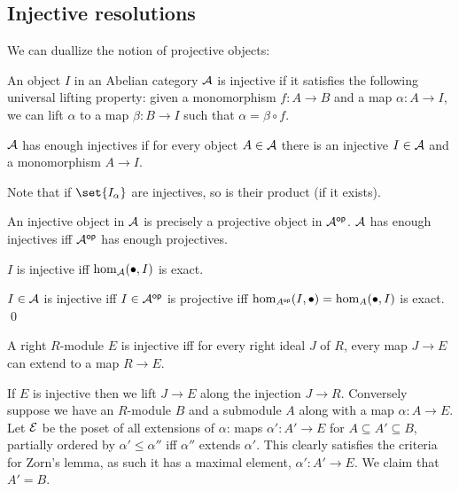 \eproof

\subsection{Injective resolutions}

We can duallize the notion of projective objects:

\bdefn

    An object $I$ in an Abelian category ${{\cal A}}$ is {\emphcolor injective} if it satisfies the following universal lifting property:
    given a monomorphism $f\colon A\to B$ and a map $\alpha\colon A\to I$, we can lift $\alpha$ to a map $\beta\colon B\to I$ such that $\alpha=\beta\circ f$.

    \centerline{}

    ${{\cal A}}$ has enough injectives if for every object $A\in{{\cal A}}$ there is an injective $I\in{{\cal A}}$ and a monomorphism $A\to I$.

\edefn

Note that if $\set{I_\alpha}$ are injectives, so is their product (if it exists).

\blemm

    An injective object in ${{\cal A}}$ is precisely a projective object in ${{\cal A}}^{\sf op}$.
    ${{\cal A}}$ has enough injectives iff ${{\cal A}}^{\sf op}$ has enough projectives.

\elemm

\bcoro

    $I$ is injective iff $\hom_{{\cal A}}(\bullet,I)$ is exact.

\ecoro

\bproof

    $I\in{{\cal A}}$ is injective iff $I\in{{\cal A}}^{\sf op}$ is projective iff $\hom_{A^{\sf op}}(I,\bullet)=\hom_A(\bullet,I)$ is exact.
    \qed

\eproof

\bprop[title=Baer's criterion]

    A right $R$-module $E$ is injective iff for every right ideal $J$ of $R$, every map $J\to E$ can extend to a map $R\to E$.

\eprop

\bproof

    If $E$ is injective then we lift $J\to E$ along the injection $J\to R$.
    Conversely suppose we have an $R$-module $B$ and a submodule $A$ along with a map $\alpha\colon A\to E$.
    Let ${\cal E}$ be the poset of all extensions of $\alpha$: maps $\alpha'\colon A'\to E$ for $A\subseteq A'\subseteq B$, partially ordered by $\alpha'\leq\alpha''$ iff $\alpha''$ extends $\alpha'$.
    This clearly satisfies the criteria for Zorn's lemma, as such it has a maximal element, $\alpha'\colon A'\to E$.
    We claim that $A'=B$.

